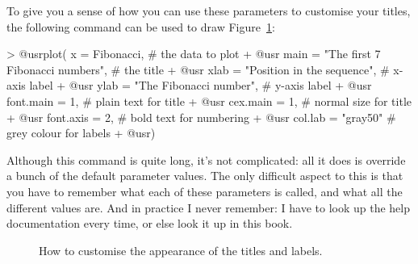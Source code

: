 To give you a sense of how you can use these parameters to customise your titles, the following command can be used to draw Figure~\ref{fig:thirdplot}:
\begin{rblock1}
> @usr{plot( x = Fibonacci,}                           # the data to plot
+ @usr{      main = "The first 7 Fibonacci numbers",}  # the title 
+ @usr{      xlab = "Position in the sequence",}       # x-axis label
+ @usr{      ylab = "The Fibonacci number",}           # y-axis label
+ @usr{      font.main = 1,}                           # plain text for title 
+ @usr{      cex.main = 1,}                            # normal size for title
+ @usr{      font.axis = 2,}                           # bold text for numbering
+ @usr{      col.lab = "gray50"}                       # grey colour for labels
+ @usr{)}
\end{rblock1}
Although this command is quite long, it's not complicated: all it does is override a bunch of the default parameter values. The only difficult aspect to this is that you have to remember what each of these parameters is called, and what all the different values are. And in practice I never remember: I have to look up the help documentation every time, or else look it up in this book.
\begin{figure}[t]
\begin{center}
\caption{How to customise the appearance of the titles and labels.}
\HR
\label{fig:thirdplot}
\end{center}
\end{figure}




